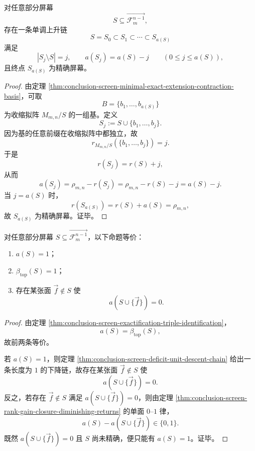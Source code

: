 \begin{theorem}[精确化缺口的一步一单位下降链]\label{thm:conclusion-screen-deficit-unit-descent-chain}
对任意部分屏幕
\[
S\subseteq \overrightarrow{\mathcal F_m^{n-1}},
\]
存在一条单调上升链
\[
S=S_0\subset S_1\subset \cdots \subset S_{a(S)}
\]
满足
\[
|S_j\setminus S|=j,
\qquad
a(S_j)=a(S)-j
\qquad
(0\le j\le a(S)),
\]
且终点 \(S_{a(S)}\) 为精确屏幕。
\end{theorem}
\begin{proof}
由定理 \ref{thm:conclusion-screen-minimal-exact-extension-contraction-basis}，可取
\[
B=\{b_1,\dots,b_{a(S)}\}
\]
为收缩拟阵 \(M_{m,n}/S\) 的一组基。定义
\[
S_j:=S\cup\{b_1,\dots,b_j\}.
\]
因为基的任意前缀在收缩拟阵中都独立，故
\[
r_{M_{m,n}/S}(\{b_1,\dots,b_j\})=j.
\]
于是
\[
r(S_j)=r(S)+j,
\]
从而
\[
a(S_j)=\rho_{m,n}-r(S_j)=\rho_{m,n}-r(S)-j=a(S)-j.
\]
当 \(j=a(S)\) 时，
\[
r(S_{a(S)})=r(S)+a(S)=\rho_{m,n},
\]
故 \(S_{a(S)}\) 为精确屏幕。证毕。
\end{proof}

\begin{corollary}[单洞缺口的一步闭合判据]\label{cor:conclusion-screen-single-hole-one-step-closure}
对任意部分屏幕 \(S\subseteq \overrightarrow{\mathcal F_m^{n-1}}\)，以下命题等价：
\begin{enumerate}
  \item \(a(S)=1\)；
  \item \(\beta_{\mathrm{top}}(S)=1\)；
  \item 存在某张面 \(\vec f\notin S\) 使
        \[
        a(S\cup\{\vec f\})=0.
        \]
\end{enumerate}
\end{corollary}
\begin{proof}
由定理 \ref{thm:conclusion-screen-exactification-triple-identification}，
\[
a(S)=\beta_{\mathrm{top}}(S),
\]
故前两条等价。

若 \(a(S)=1\)，则定理 \ref{thm:conclusion-screen-deficit-unit-descent-chain} 给出一条长度为 \(1\) 的下降链，故存在某张面 \(\vec f\notin S\) 使
\[
a(S\cup\{\vec f\})=0.
\]
反之，若存在 \(\vec f\notin S\) 满足 \(a(S\cup\{\vec f\})=0\)，则由定理 \ref{thm:conclusion-screen-rank-gain-closure-diminishing-returns} 的单面 \(0\text{--}1\) 律，
\[
a(S)-a(S\cup\{\vec f\})\in\{0,1\}.
\]
既然 \(a(S\cup\{\vec f\})=0\) 且 \(S\) 尚未精确，便只能有 \(a(S)=1\)。证毕。
\end{proof}

